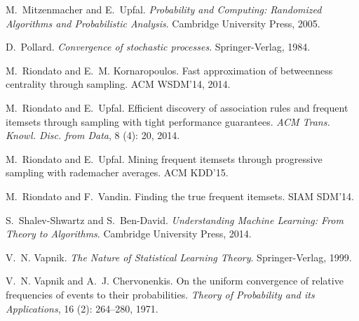 \documentclass{sig-alternate-2013}
\begin{document}
\begin{thebibliography}{17}
M.~Mitzenmacher and E.~Upfal.
\newblock \emph{Probability and Computing: Randomized Algorithms and
  Probabilistic Analysis}.
\newblock Cambridge University Press, 2005.

D.~Pollard.
\newblock \emph{Convergence of stochastic processes}.
\newblock Springer-Verlag, 1984.

M.~Riondato and E.~M. Kornaropoulos.
\newblock Fast approximation of betweenness centrality through sampling.
\newblock ACM WSDM'14, 2014.

M.~Riondato and E.~Upfal.
\newblock Efficient discovery of association rules and frequent itemsets
  through sampling with tight performance guarantees.
\newblock \emph{ACM Trans. Knowl. Disc. from Data}, 8 (4):
  20, 2014.

M.~Riondato and E.~Upfal.
\newblock Mining frequent itemsets through progressive sampling with rademacher
  averages.
\newblock ACM KDD'15.

M.~Riondato and F.~Vandin.
\newblock Finding the true frequent itemsets.
\newblock SIAM SDM'14.

S.~Shalev-Shwartz and S.~Ben-David.
\newblock \emph{Understanding Machine Learning: From Theory to Algorithms}.
\newblock Cambridge University Press, 2014.

V.~N. Vapnik.
\newblock \emph{The Nature of Statistical Learning Theory}.
\newblock Springer-Verlag, 1999.

V.~N. Vapnik and A.~J. Chervonenkis.
\newblock On the uniform convergence of relative frequencies of events to their
  probabilities.
\newblock \emph{Theory of Probability and its Applications}, 16
  (2): 264--280, 1971.
\end{thebibliography}
\end{document}
